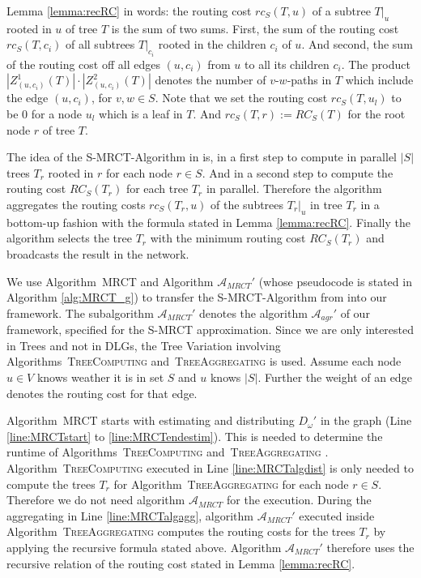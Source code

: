 \documentclass[11pt]{article}
\newcommand{\todoI}[1]{}\newcommand{\blueI}[1]{}
\newif\iffull
\begin{document}
Lemma \ref{lemma:recRC} in words: the routing cost $rc_S(T,u)$ of a subtree $T|_{u}$ rooted in $u$ of tree $T$ is the sum of two sums. First, the sum of the routing cost $rc_S(T,c_i)$ of all subtrees $T|_{c_i}$ rooted in the children $c_i$ of $u$. And second, the sum of the routing cost off all edges $(u,c_i)$ from $u$ to all its children $c_i$. The product $|Z_{\left(u,c_i\right)}^1\left(T\right)|\cdot|Z_{\left(u,c_i\right)}^2\left(T\right)|$ denotes the number of $v$-$w$-paths in $T$ which include the edge $(u,c_i)$, for $v,w\in S$. Note that we set the routing cost $rc_S(T,u_l)$ to be $0$ for a node $u_l$ which is a leaf in $T$. And $rc_S(T,r):=RC_S(T)$ for the root node $r$ of tree $T$\todoI{Notation anpassen}.

The idea of the S-MRCT-Algorithm in \cite{hochuli:holzer:MRCST} is, in a first step to compute in parallel $|S|$ trees $T_r$ rooted in $r$ for each node $r\in S$. And in a second step to compute the routing cost $RC_S(T_r)$ for each tree $T_r$ in parallel. Therefore the algorithm aggregates the routing costs $rc_S(T_r,u)$ of the subtrees $T_r|_u$ in tree $T_r$ in a bottom-up fashion with the formula stated in Lemma \ref{lemma:recRC}. Finally the algorithm selects the tree $T_r$ with the minimum routing cost $RC_S(T_r)$ and broadcasts the result in the network.

We use Algorithm\iffull~\ref{alg:MRCT}\fi~\textsc{MRCT}  and Algorithm $\mathcal{A}_{MRCT}'$ (whose pseudocode is stated in Algorithm \ref{alg:MRCT_g}) to transfer the S-MRCT-Algorithm from \cite{hochuli:holzer:MRCST} into our framework. The subalgorithm $\mathcal{A}_{MRCT}'$ denotes the algorithm $\mathcal{A}_{agr}'$ of our framework, specified for the S-MRCT approximation.
Since we are only interested in Trees and not in DLGs, the Tree Variation involving Algorithms\iffull~\ref{alg:TreeComputing}\fi~\textsc{TreeComputing}  and\iffull~\ref{alg:TreeAggregating}\fi~\textsc{TreeAggregating}  is used. 
Assume each node $u\in V$ knows weather it is in set $S$ and $u$ knows $|S|$. Further the weight of an edge denotes the routing cost for that edge.

Algorithm\iffull~\ref{alg:MRCT}\fi~\textsc{MRCT}  starts with estimating and distributing $D_\omega'$ in the graph (Line \ref{line:MRCTstart} to \ref{line:MRCTendestim}). This is needed to determine the runtime of Algorithms\iffull~\ref{alg:TreeComputing}\fi~\textsc{TreeComputing}  and\iffull~\ref{alg:TreeAggregating}\fi~\textsc{TreeAggregating} . Algorithm\iffull~\ref{alg:TreeComputing}\fi~\textsc{TreeComputing}  executed in Line \ref{line:MRCTalgdist} is only needed to compute the trees $T_r$ for Algorithm\iffull~\ref{alg:TreeAggregating}\fi~\textsc{TreeAggregating}  for each node $r\in S$. Therefore we do not need algorithm $\mathcal{A}_{MRCT}$ for the execution. During the aggregating in Line \ref{line:MRCTalgagg}, algorithm $\mathcal{A}_{MRCT}'$ executed inside Algorithm\iffull~\ref{alg:TreeAggregating}\fi~\textsc{TreeAggregating}  computes the routing costs for the trees $T_r$ by applying the recursive formula stated above. Algorithm $\mathcal{A}_{MRCT}'$ therefore uses the recursive relation of the routing cost stated in Lemma \ref{lemma:recRC}.
\end{document}
